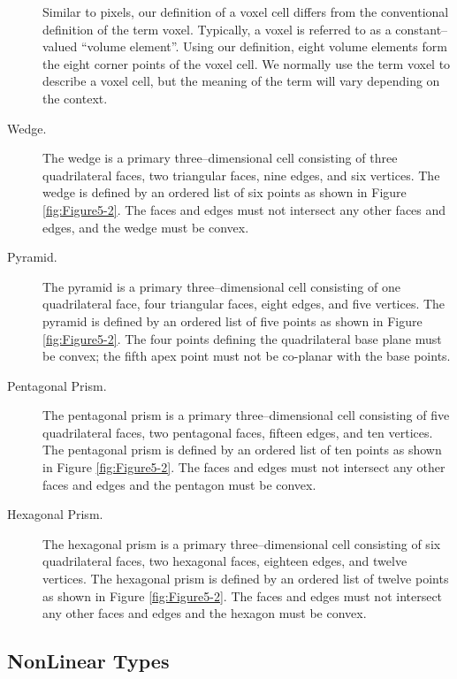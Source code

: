 \begin{description}
Similar to pixels, our definition of a voxel cell differs from the conventional definition of the term voxel. Typically, a voxel is referred to as a constant--valued ``volume element''. Using our definition, eight volume elements form the eight corner points of the voxel cell. We normally use the term voxel to describe a voxel cell, but the meaning of the term will vary depending on the context.

\item[Wedge.\index{cell!wedge}] The wedge is a primary three--dimensional cell consisting of three quadrilateral faces, two triangular faces, nine edges, and six vertices. The wedge is defined by an ordered list of six points as shown in Figure \ref{fig:Figure5-2}. The faces and edges must not intersect any other faces and edges, and the wedge must be convex.

\item[Pyramid.\index{cell!pyramid}] The pyramid is a primary three--dimensional cell consisting of one quadrilateral face, four triangular faces, eight edges, and five vertices. The pyramid is defined by an ordered list of five points as shown in Figure \ref{fig:Figure5-2}. The four points defining the quadrilateral base plane must be convex; the fifth apex point must not be co-planar with the base points.

\item[Pentagonal Prism.] The pentagonal prism is a primary three--dimensional cell consisting of five quadrilateral faces, two pentagonal faces, fifteen edges, and ten vertices. The pentagonal prism is defined by an ordered list of ten points as shown in Figure \ref{fig:Figure5-2}. The faces and edges must not intersect any other faces and edges and the pentagon must be convex.

\item[Hexagonal Prism.] The hexagonal prism is a primary three--dimensional cell consisting of six quadrilateral faces, two hexagonal faces, eighteen edges, and twelve vertices. The hexagonal prism is defined by an ordered list of twelve points as shown in Figure \ref{fig:Figure5-2}. The faces and edges must not intersect any other faces and edges and the hexagon must be convex.

\end{description}

\subsection{NonLinear Types}

